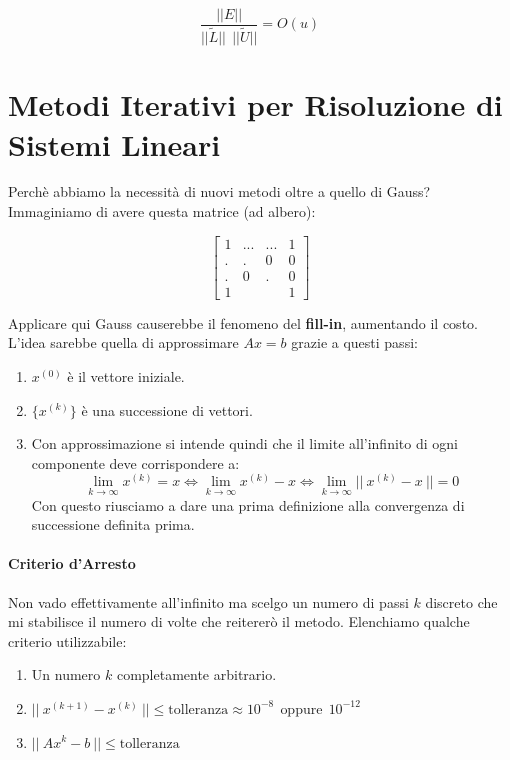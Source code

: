 \documentclass{article}
\begin{document}
\[ \frac{||E||}{||\tilde{L}||\:\: ||\tilde{U}||} = O(u) \]

\newpage

\section{Metodi Iterativi per Risoluzione di Sistemi Lineari}

Perchè abbiamo la necessità di nuovi metodi oltre a quello di Gauss? Immaginiamo di avere questa matrice (ad albero):

\[
\begin{bmatrix}
    1 & ... & ... & 1\\
    . & .   & 0 & 0 \\
    . & 0 & .& 0 \\
    1 & & & 1
\end{bmatrix}
\]

Applicare qui Gauss causerebbe il fenomeno del \textbf{fill-in}, aumentando il costo. L'idea sarebbe quella di approssimare $Ax = b$ grazie a questi passi:

\begin{enumerate}
    \item $x^{(0)}$ è il vettore iniziale.
    \item $\{ x^{(k)} \}$ è una successione di vettori.
    \item Con approssimazione si intende quindi che il limite all'infinito di ogni componente deve corrispondere a:
    \[ \lim_{k \rightarrow \infty} x^{(k)} = x \Leftrightarrow \lim_{k \rightarrow \infty} x^{(k)} - x \Leftrightarrow \lim_{k \rightarrow \infty} ||\:x^{(k)} - x \:|| = 0 \]
    Con questo riusciamo a dare una prima definizione alla convergenza di successione definita prima.
\end{enumerate}

\paragraph{Criterio d'Arresto} Non vado effettivamente all'infinito ma scelgo un numero di passi $k$ discreto che mi stabilisce il numero di volte che reitererò il metodo. Elenchiamo qualche criterio utilizzabile:

\begin{enumerate}
    \item Un numero $k$ completamente arbitrario.
    \item $||\: x^{(k+1)} - x^{(k)} \:|| \leq \text{tolleranza} \approx 10^{-8} \:\: \text{oppure} \:\: 10^{-12} $
    \item $||\: Ax^{k} - b \:|| \leq \text{tolleranza}$
\end{enumerate}
\end{document}
